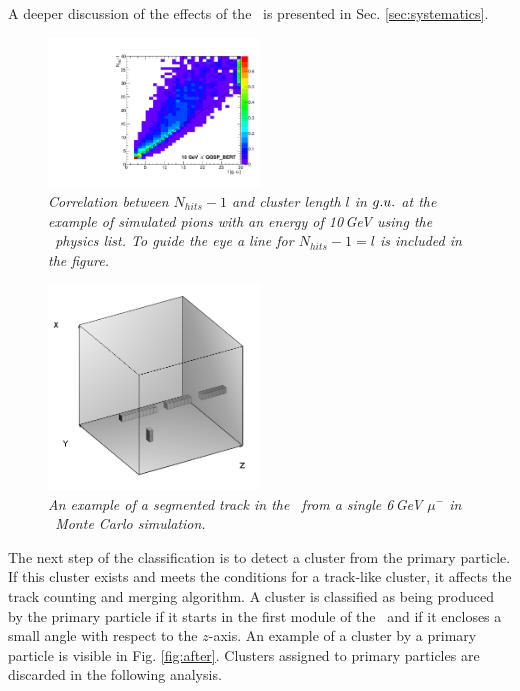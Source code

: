 A deeper discussion of the effects of the  \ep\ is presented in Sec. \ref{sec:systematics}. 

\begin{figure}
	\centering
	\includegraphics[width=0.5\textwidth]{ECAL/plots/l-nhits.pdf}
	\caption{\label{fig:lnhits} \sl Correlation between $N_{hits} - 1$ and cluster length $l$ in ${\sl g.u.}$ at the example of simulated pions with an energy of 10\,GeV using the \qgsp\ physics list. To guide the eye a line for $N_{hits} - 1=l$ is included in the figure.}
\end{figure}


\begin{figure}
	\centering
	\includegraphics[width=0.5\textwidth]{ECAL/graphics/segmented-track-example.png}
	\caption{\label{fig:demomerge} \sl An example of a segmented track in the \ecal\ from a single 6\,GeV $\mu^-$ in \ftfp\ Monte Carlo simulation.}
\end{figure}
The next step of the classification is to detect a cluster from the primary particle. 
If this cluster exists and meets the conditions for a track-like cluster, it affects the track counting and merging algorithm.
A cluster is classified as being produced by the primary particle if it starts in the first module of the \ecal\ and if it encloses a small angle with respect to the $z$-axis. 
An example of a cluster by a primary particle is visible in Fig. \ref{fig:after}. Clusters assigned to primary particles are discarded in the following analysis. 


